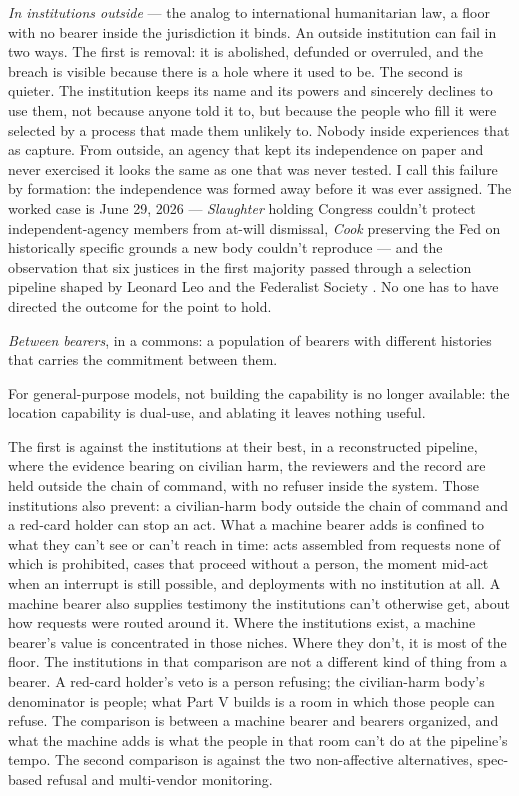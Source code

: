 \emph{In institutions outside} — the analog to international humanitarian law, a floor with no bearer inside the jurisdiction it binds. An outside institution can fail in two ways. The first is removal: it is abolished, defunded or overruled, and the breach is visible because there is a hole where it used to be. The second is quieter. The institution keeps its name and its powers and sincerely declines to use them, not because anyone told it to, but because the people who fill it were selected by a process that made them unlikely to. Nobody inside experiences that as capture. From outside, an agency that kept its independence on paper and never exercised it looks the same as one that was never tested. I call this failure by formation: the independence was formed away before it was ever assigned. The worked case is June 29, 2026 — \emph{Slaughter} holding Congress couldn't protect independent-agency members from at-will dismissal, \emph{Cook} preserving the Fed on historically specific grounds a new body couldn't reproduce \autocite{slaughter2026,cook2026} — and the observation that six justices in the first majority passed through a selection pipeline shaped by Leonard Leo and the Federalist Society \autocite{propublica2023leo,cbs2018leo}. No one has to have directed the outcome for the point to hold.

\emph{Between bearers}, in a commons: a population of bearers with different histories that carries the commitment between them.

For general-purpose models, not building the capability is no longer available: the location capability is dual-use, and ablating it leaves nothing useful.


The first is against the institutions at their best, in a reconstructed pipeline, where the evidence bearing on civilian harm, the reviewers and the record are held outside the chain of command, with no refuser inside the system. Those institutions also prevent: a civilian-harm body outside the chain of command and a red-card holder can stop an act. What a machine bearer adds is confined to what they can't see or can't reach in time: acts assembled from requests none of which is prohibited, cases that proceed without a person, the moment mid-act when an interrupt is still possible, and deployments with no institution at all. A machine bearer also supplies testimony the institutions can't otherwise get, about how requests were routed around it. Where the institutions exist, a machine bearer's value is concentrated in those niches. Where they don't, it is most of the floor. The institutions in that comparison are not a different kind of thing from a bearer. A red-card holder's veto is a person refusing; the civilian-harm body's denominator is people; what Part V builds is a room in which those people can refuse. The comparison is between a machine bearer and bearers organized, and what the machine adds is what the people in that room can't do at the pipeline's tempo. The second comparison is against the two non-affective alternatives, spec-based refusal and multi-vendor monitoring.

